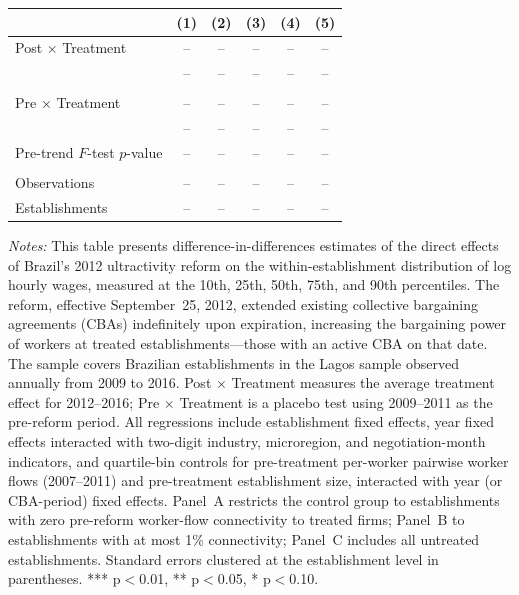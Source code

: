 \documentclass[12pt,letterpaper]{article}
\begin{document}
\begin{table}[]
\begin{threeparttable}
\begin{tabular}{lccccc}
 & (1) & (2) & (3) & (4) & (5) \\
\midrule
Post $\times$ Treatment & -- & -- & -- & -- & -- \\
  & -- & -- & -- & -- & -- \\
  &  &  &  &  & \\
Pre $\times$ Treatment & -- & -- & -- & -- & -- \\
  & -- & -- & -- & -- & -- \\
Pre-trend $F$-test $p$-value & -- & -- & -- & -- & -- \\
  &  &  &  &  & \\
Observations & -- & -- & -- & -- & -- \\
Establishments & -- & -- & -- & -- & -- \\
\bottomrule
\end{tabular}
\scriptsize
\begin{tablenotes}
\item \textit{Notes:} This table presents difference-in-differences estimates of the direct effects of Brazil's 2012 ultractivity reform on the within-establishment distribution of log hourly wages, measured at the 10th, 25th, 50th, 75th, and 90th percentiles. The reform, effective September~25, 2012, extended existing collective bargaining agreements (CBAs) indefinitely upon expiration, increasing the bargaining power of workers at treated establishments---those with an active CBA on that date. The sample covers Brazilian establishments in the Lagos sample observed annually from 2009 to 2016. Post $\times$ Treatment measures the average treatment effect for 2012--2016; Pre $\times$ Treatment is a placebo test using 2009--2011 as the pre-reform period. All regressions include establishment fixed effects, year fixed effects interacted with two-digit industry, microregion, and negotiation-month indicators, and quartile-bin controls for pre-treatment per-worker pairwise worker flows (2007--2011) and pre-treatment establishment size, interacted with year (or CBA-period) fixed effects. Panel~A restricts the control group to establishments with zero pre-reform worker-flow connectivity to treated firms; Panel~B to establishments with at most 1\% connectivity; Panel~C includes all untreated establishments. Standard errors clustered at the establishment level in parentheses. *** p$<$0.01, ** p$<$0.05, * p$<$0.10.
\end{tablenotes}
\end{threeparttable}
\end{table}
\end{document}
